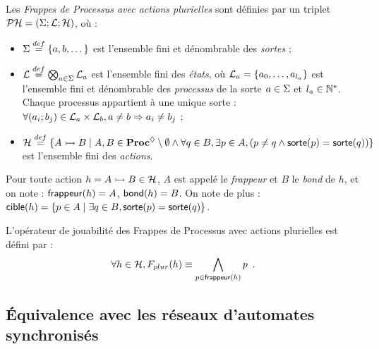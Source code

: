\begin{definition}
  Les \emph{Frappes de Processus avec actions plurielles} sont définies
  par un triplet $\mathcal{PH} = (\Sigma; \mathcal{L}; \mathcal{H})$, où :
  \begin{itemize}
    \item $\Sigma \stackrel{def}= \{a, b, \dots\}$ est l'ensemble fini et dénombrable des \emph{sortes} ;
    \item $\mathcal{L} \stackrel{def}= \bigotimes_{a \in \Sigma} \mathcal{L}_a$ est l'ensemble fini des \emph{états},
      où $\mathcal{L}_a = \{a_0, \ldots, a_{l_a}\}$ est l'ensemble fini et dénombrable
      des \emph{processus} de la sorte $a \in \Sigma$ et $l_a \in \mathbb{N}^*$.
      Chaque processus appartient à une unique sorte :
      $\forall (a_i; b_j) \in \mathcal{L}_a \times \mathcal{L}_b, a \neq b \Rightarrow a_i \neq b_j$ ;
    \item $\mathcal{H} \stackrel{def}= \{\mbox{$A \rightarrowtail B$} \mid A, B \in \mathbf{Proc}^{\lozenge} \setminus \emptyset \wedge
      \forall q \in B, \exists p \in A, (p \neq q \wedge \mathsf{sorte}(p) = \mathsf{sorte}(q)) \}$
      est l'ensemble fini des \emph{actions}.
  \end{itemize}
\end{definition}
%
\noindent
Pour toute action $h = \mbox{$A \rightarrowtail B$} \in \mathcal{H}$,
$A$ est appelé le \emph{frappeur} et $B$ le \emph{bond} de $h$,
et on note : $\mathsf{frappeur}(h) = A$, $\mathsf{bond}(h) = B$.
On note de plus :
$\mathsf{cible}(h) = \{ p \in A \mid \exists q \in B, \mathsf{sorte}(p) = \mathsf{sorte}(q) \}$.

\begin{definition}
  L'opérateur de jouabilité des Frappes de Processus avec actions plurielles est défini par :
  \[\forall h \in \mathcal{H}, F_{plur}(h) \equiv \bigwedge_{p \in \mathsf{frappeur}(h)} p \enspace.\]
\end{definition}



\subsection{Équivalence avec les réseaux d'automates synchronisés}





